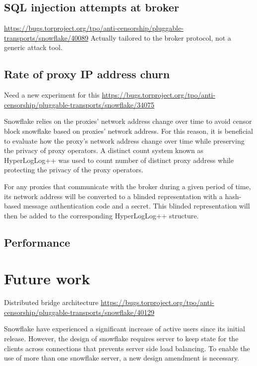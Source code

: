 \documentclass[letterpaper,twocolumn]{article}
\begin{document}
\subsection{SQL injection attempts at broker}


\url{https://bugs.torproject.org/tpo/anti-censorship/pluggable-transports/snowflake/40089}
Actually tailored to the broker protocol, not a generic attack tool.

\subsection{Rate of proxy IP address churn}


Need a new experiment for this
\url{https://bugs.torproject.org/tpo/anti-censorship/pluggable-transports/snowflake/34075}


Snowflake relies on the proxies' network address change over time to avoid censor block snowflake based on proxies' network address. For this reason, it is beneficial to evaluate how the proxy's network address change over time while preserving the privacy of proxy operators. A distinct count system known as HyperLogLog++ was used to count number of distinct proxy address while protecting the privacy of the proxy operators.

For any proxies that communicate with the broker during a given period of time, its network address will be converted to a blinded representation with a hash-based message authentication code and a secret. This blinded representation will then be added to the corresponding HyperLogLog++ structure.

\subsection{Performance}
\label{sec:performance}


\section{Future work}
\label{sec:future}


Distributed bridge architecture
\url{https://bugs.torproject.org/tpo/anti-censorship/pluggable-transports/snowflake/40129}

Snowflake have experienced a significant increase of active users since its initial release. However, the design of snowflake requires server to keep state for the clients across connections that prevents server side load balancing. To enable the use of more than one snowflake server, a new design amendment is necessary.
\end{document}
